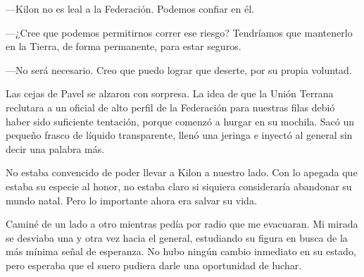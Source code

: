 —Kilon no es leal a la Federación. Podemos confiar en él.

—¿Cree que podemos permitirnos correr ese riesgo? Tendríamos que mantenerlo en la Tierra, de forma permanente, para estar seguros.

—No será necesario. Creo que puedo lograr que deserte, por su propia voluntad.

Las cejas de Pavel se alzaron con sorpresa. La idea de que la Unión Terrana reclutara a un oficial de alto perfil de la Federación para nuestras filas debió haber sido suficiente tentación, porque comenzó a hurgar en su mochila. Sacó un pequeño frasco de líquido transparente, llenó una jeringa e inyectó al general sin decir una palabra más.

No estaba convencido de poder llevar a Kilon a nuestro lado. Con lo apegada que estaba su especie al honor, no estaba claro si siquiera consideraría abandonar su mundo natal. Pero lo importante ahora era salvar su vida.

Caminé de un lado a otro mientras pedía por radio que me evacuaran. Mi mirada se desviaba una y otra vez hacia el general, estudiando su figura en busca de la más mínima señal de esperanza. No hubo ningún cambio inmediato en su estado, pero esperaba que el suero pudiera darle una oportunidad de luchar.